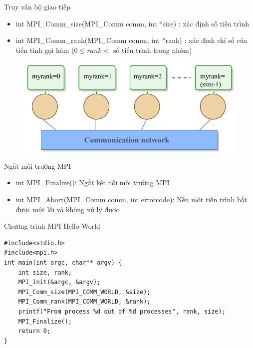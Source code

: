 \documentclass[10pt]{beamer}
\theoremstyle{remark}
\numberwithin{algocf}{section}
\numberwithin{equation}{section}
\numberwithin{dl}{section}
\numberwithin{figure}{section}
\begin{document}
\begin{frame}{Truy vấn bộ giao tiếp}
    \begin{itemize}
        \item int MPI\_Comm\_size(MPI\_Comm comm, int *size) : xác định số tiến trình
        \item int MPI\_Comm\_rank(MPI\_Comm comm, int *rank) : xác định chỉ số của tiến tình gọi hàm ($0 \leq rank <$ số tiến trình trong nhóm)
    \end{itemize}
    \begin{figure}[H]
        \centering
        \includegraphics[height=0.4\textheight]{figures/MPI/Rank.png}
    \end{figure}
\end{frame}

\begin{frame}{Ngắt môi trường MPI}
    \begin{itemize}
        \item int MPI\_Finalize(): Ngắt kết nối môi trường MPI
        \item int MPI\_Abort(MPI\_Comm comm, int errorcode): Nếu một tiến trình bắt được một lỗi và không xử lý được
    \end{itemize}
\end{frame}

\begin{frame}[fragile]{Chương trình MPI Hello World}
    \begin{verbatim}
#include<stdio.h>
#include<mpi.h>
int main(int argc, char** argv) {
    int size, rank;
    MPI_Init(&argc, &argv);
    MPI_Comm_size(MPI_COMM_WORLD, &size);
    MPI_Comm_rank(MPI_COMM_WORLD, &rank);
    printf("From process %d out of %d processes", rank, size);
    MPI_Finalize();
    return 0;
}
    \end{verbatim}
\end{frame}
\end{document}
